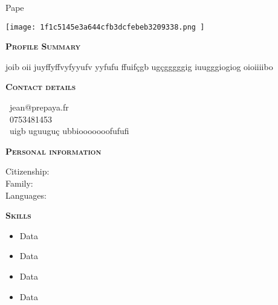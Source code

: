 \documentclass[11pt,a4paper]{article}
\newcommand{\headleft}[1]{\vspace*{3ex}\textsc{\textbf{#1}}\par%
    \vspace*{-1.5ex}\hrulefill\par\vspace*{0.7ex}}
\begin{document}
\setlength{\topskip}{0pt}\setlength{\parindent}{0pt}\setlength{\parskip}{0pt}
\setlength{\fboxsep}{0pt}\pagestyle{empty}\raggedbottom

\begin{minipage}[t]{0.33\textwidth}
\colorbox{cvblue}{\begin{minipage}[t][5mm][t]{\textwidth}\null\hfill\null\end{minipage}}
\vspace{-.2ex}
\colorbox{cvblue!90}{\color{white}
\textwidth
\begin{minipage}[t][293mm][t]{0.82\textwidth}\raggedright
\vspace*{2.5ex}

\Large Pape \textbf{\textscFALL} \normalsize


\null\hfill\texttt{[image:  1f1c5145e3a644cfb3dcfebeb3209338.png ]}\hfill\null


\vspace*{0.5ex}

\headleft{Profile Summary}
joib oii juyffyffvyfyyufv yyfufu ffuifçgb ugçgggggig  iuugggiogiog oioiiiibo

\headleft{Contact details}\small
\MVAt\ {\small jean@prepaya.fr} \\[0.4ex]
\Mobilefone\ 0753481453 \\[0.5ex]
\Letter\ uigb uguuguç ubbiooooooofufufi
\normalsize

\headleft{Personal information}
Citizenship: \textbfsenegalaise \\[0.5ex]
Family:  \\[0.5ex]
Languages: 

\headleft{Skills}
\begin{itemize}

  \item Data

  \item Data

  \item Data

  \item Data

\end{itemize}

\end{minipage}\textwidth
}
\end{minipage}
\end{document}
